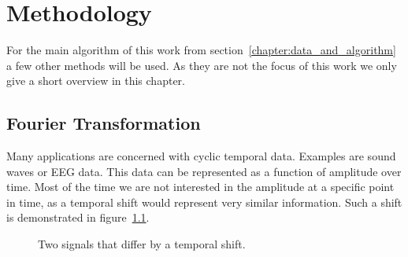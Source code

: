 \chapter{Methodology}
\label{chapter:methodology}

For the main algorithm of this work from section~\ref{chapter:data_and_algorithm} a few other methods will be used. As they are not the focus of this work we only give a short overview \color{change} in this chapter. \color{black}

\section{Fourier Transformation}
\label{sec:fourier_transformation}

Many applications are concerned with cyclic temporal data. Examples are sound waves or EEG data. This data can be represented as a function of amplitude over time. Most of the time we are not interested in the amplitude at a specific point in time, as a temporal shift would represent very similar information. Such a shift is demonstrated in figure~\ref{fig:tempoal_shift}.

\begin{figure}
	\centering
	
	\begin{subfigure}[b]{\textwidth}
	\end{subfigure}
	
	\caption{Two signals that differ by a temporal shift.}
	\label{fig:tempoal_shift}
\end{figure}

